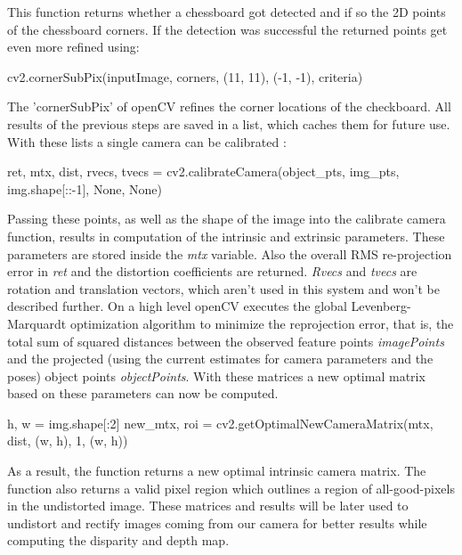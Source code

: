 \documentclass[journal,onecolumn]{IEEEtran}
\begin{document}
This function returns whether a chessboard got detected and if so the 2D points of the chessboard corners. If the detection was successful the returned points get even more refined using:
\begin{python}
cv2.cornerSubPix(inputImage, corners, (11, 11), (-1, -1), criteria)
\end{python}
The 'cornerSubPix' of openCV refines the corner locations \cite{forstner} of the checkboard.
All results of the previous steps are saved in a list, which caches them for future use. With these lists a single camera can be calibrated :
\begin{python}
ret, mtx, dist, rvecs, tvecs = cv2.calibrateCamera(object_pts, img_pts, img.shape[::-1], None,
											None)
\end{python}
Passing these points, as well as the shape of the image into the calibrate camera function, results in computation of the intrinsic and extrinsic parameters.
These parameters are stored inside the \emph{mtx} variable. Also the overall RMS re-projection error\cite{hartley_zisserman_2004} in \emph{ret} and the distortion coefficients are returned. \emph{Rvecs}\cite{DBLP} and \emph{tvecs} are rotation and translation vectors, which aren't used in this system and won't be described further.
On a high level openCV executes the global Levenberg-Marquardt optimization algorithm to minimize the reprojection error, that is, the total sum of squared distances between the observed feature points \emph{imagePoints} and the projected (using the current estimates for camera parameters and the poses) object points \emph{objectPoints}\cite{calibrateCamera}.
With these matrices a new optimal matrix based on these parameters can now be computed.
\begin{python}
h, w = img.shape[:2]
new_mtx, roi = cv2.getOptimalNewCameraMatrix(mtx, dist, (w, h), 1, (w, h))
\end{python}
As a result, the function returns a new optimal intrinsic camera matrix. The function also returns a valid pixel region which outlines a region of all-good-pixels in the undistorted image. These matrices and results will be later used to undistort and rectify images coming from our camera for better results while computing the disparity and depth map.
\end{document}
